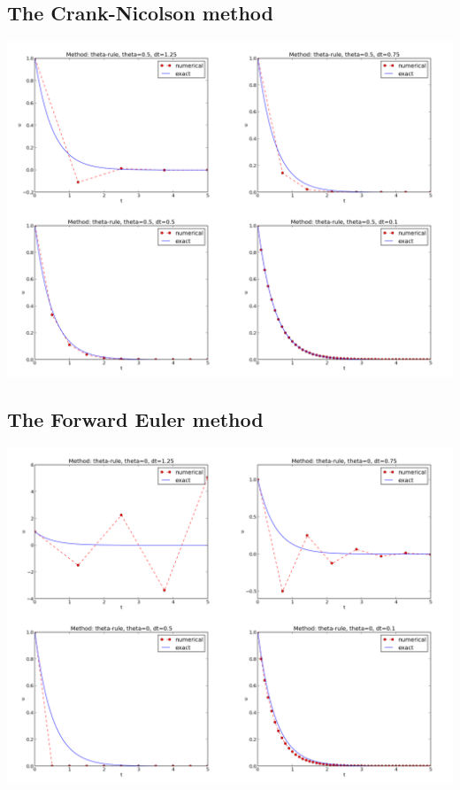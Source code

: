 \documentclass[twoside]{article}
\begin{document}

\subsection{The Crank-Nicolson method}



\begin{center}  %
  \centerline{\includegraphics[width=0.9\linewidth]{CN.png}}
\end{center}





\subsection{The Forward Euler method}



\begin{center}  %
  \centerline{\includegraphics[width=0.9\linewidth]{FE.png}}
\end{center}
\end{document}
